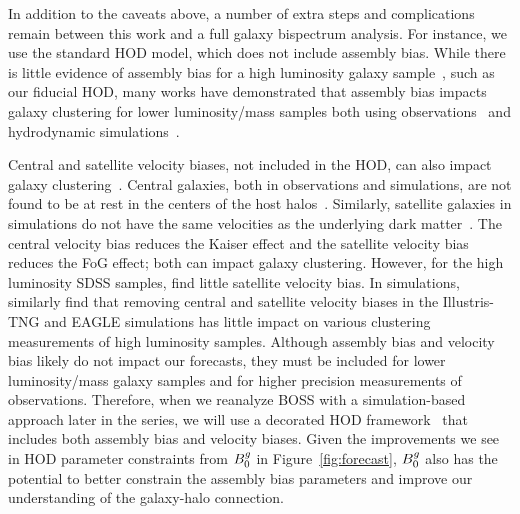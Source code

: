 In addition to the caveats above, a number of extra steps and complications remain
between this work and a full galaxy bispectrum analysis. For instance, we use
the standard \cite{zheng2007} HOD model,
which does not include assembly bias. While there is little evidence of
assembly bias for a high luminosity galaxy 
sample~\citep{zentner2016, vakili2019, beltz-mohrmann2020}, such as our 
fiducial HOD,
many works have demonstrated that assembly bias impacts galaxy
clustering for lower luminosity/mass samples both using
observations~\citep{pujol2014, hearin2016, pujol2017, zentner2019, vakili2019, obuljen2020}
and hydrodynamic simulations~\citep{chaves-montero2016, beltz-mohrmann2020}. 
 
Central and satellite velocity biases, not included in the
\cite{zheng2007} HOD, can also impact galaxy clustering~\citep{guo2015a,guo2015}. 
Central galaxies, both in observations and simulations, are not found to be 
at rest in the centers of the host 
halos~\citep[\eg][]{berlind2003, yoshikawa2003, vandenbosch2005, skibba2011}. 
Similarly, satellite galaxies in simulations do not have the same velocities as
the underlying dark matter~\citep[\eg][]{diemand2004, gao2004, lau2010,
munari2013, wu2013}. The central velocity bias reduces the Kaiser effect and
the satellite velocity bias reduces the FoG effect; both can impact
galaxy clustering. However, for the high luminosity SDSS samples,
\cite{guo2015} find little satellite velocity bias.
In simulations, \cite{beltz-mohrmann2020} similarly find that removing central and
satellite velocity biases in the Illustris-TNG and EAGLE simulations has
little impact on various clustering measurements of high luminosity
samples. Although assembly bias and velocity bias likely do not impact our 
forecasts, they must be included for lower luminosity/mass galaxy samples 
and for higher precision measurements of observations. Therefore, when 
we reanalyze BOSS with a simulation-based approach later in the series,
we will use a decorated HOD framework~\citep[\eg][]{hearin2016, vakili2019,
zhai2019} that includes both assembly bias and velocity biases. 
Given the improvements we see in HOD parameter constraints from $B^g_0$ in
Figure~\ref{fig:forecast}, $B^g_0$ also has the potential to better
constrain the assembly bias parameters and improve our understanding of the 
galaxy-halo connection. 

